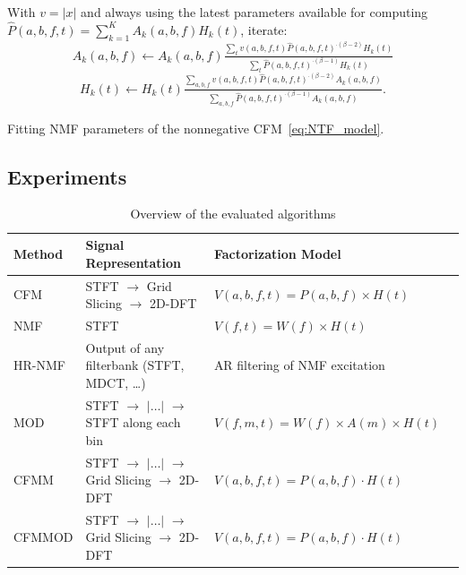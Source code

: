 \begin{algorithm}
With $v=\left|x\right|$ and always using the latest
parameters available for computing
 $\hat{P}\left(a,b,f,t\right)=\sum\limits_{k=1}^{K}A_{k}\left(a,b,f\right)H_{k}\left(t\right)$,
iterate:
\[
A_{k}\left(a,b,f\right)\leftarrow A_{k}\left(a,b,f\right)\tfrac{\sum_{t}v\left(a,b,f,t\right)\hat{P}\left(a,b,f,t\right)^{\cdot\left(\beta-2\right)}H_{k}\left(t\right)}{\sum_{t}\hat{P}\left(a,b,f,t\right)^{\cdot\left(\beta-1\right)}H_{k}\left(t\right)}
\]
\[
H_{k}\left(t\right)\leftarrow H_{k}\left(t\right)\tfrac{\sum_{a,b,f}v\left(a,b,f,t\right)\hat{P}\left(a,b,f,t\right)^{\cdot\left(\beta-2\right)}A_{k}\left(a,b,f\right)}{\sum_{a,b,f}\hat{P}\left(a,b,f,t\right)^{\cdot\left(\beta-1\right)}A_{k}\left(a,b,f\right)}.
\]


\caption{Fitting NMF parameters of the nonnegative CFM~\eqref{eq:NTF_model}.\label{alg:Fitting-NTF}}
\end{algorithm}

\subsection{Experiments}
\label{sec:experiment}

\begin{table}[ht!]
  \centering
  \scriptsize
\begin{tabular}{ llll }
    \toprule
    Method & Signal Representation & Factorization Model \\
    \midrule
    CFM~\cite{stoter16} & STFT $\rightarrow$ Grid Slicing $\rightarrow$ 2D-DFT & $V(a,b,f,t) = P(a,b,f)\times H(t)$ \\
    NMF~\cite{virtanen07} & STFT & $V(f,t) = W(f)\times H(t)$ \\
    HR-NMF~\cite{badeau13} & Output of any filterbank (STFT, MDCT, \ldots)  & AR filtering of NMF excitation \\
    MOD~\cite{barker13} & STFT $\rightarrow$ $|\ldots|$ $\rightarrow$ STFT along each bin & $V(f,m,t) = W(f)\times A(m)\times H(t)$ \\
    CFMM & STFT $\rightarrow$ $|\ldots|$ $\rightarrow$ Grid Slicing $\rightarrow$ 2D-DFT & $V(a,b,f,t) = P(a,b,f)\cdot H(t)$ \\
    CFMMOD & STFT $\rightarrow$ $|\ldots|$ $\rightarrow$ Grid Slicing $\rightarrow$ 2D-DFT & $V(a,b,f,t) = P(a,b,f)\cdot H(t)$ \\
    \bottomrule
\end{tabular}
\caption{Overview of the evaluated algorithms}
\label{tab:methods}
\end{table}

